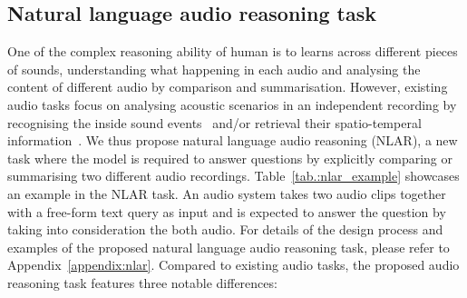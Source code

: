 \subsection{Natural language audio reasoning task} \label{subsec:audio_reasoning_task}

\begin{table}[t]
\centering
\caption{An example demonstrating APT-LLM's capacity of audio reasoning. It requires audio networks to comprehend recordings and reasoning across multiple recordings.}
\label{tab.:nlar_example}
\vspace{-0.3cm}
\end{table}

One of the complex reasoning ability of human is to learns across different pieces of sounds, understanding what happening in each audio and analysing the content of different audio by comparison and summarisation. However, existing audio tasks focus on analysing acoustic scenarios in an independent recording by recognising the inside sound events~\cite{kong_panns_2020} and/or retrieval their spatio-temperal information~\cite{politis_starss22_2022}. We thus propose natural language audio reasoning (NLAR), a new task where the model is required to answer questions by explicitly comparing or summarising two different audio recordings. Table~\ref{tab.:nlar_example} showcases an example in the NLAR task. An audio system takes two audio clips together with a free-form text query as input and is expected to answer the question by taking into consideration the both audio. For details of the design process and examples of the proposed natural language audio reasoning task, please refer to Appendix~\ref{appendix:nlar}. Compared to existing audio tasks, the proposed audio reasoning task features three notable differences:

